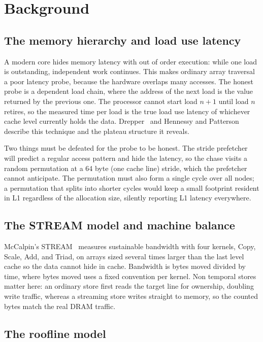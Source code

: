 \chapter{Background}

\section{The memory hierarchy and load use latency}

A modern core hides memory latency with out of order execution: while one load
is outstanding, independent work continues. This makes ordinary array traversal
a poor latency probe, because the hardware overlaps many accesses. The honest
probe is a dependent load chain, where the address of the next load is the value
returned by the previous one. The processor cannot start load $n+1$ until load
$n$ retires, so the measured time per load is the true load use latency of
whichever cache level currently holds the data. Drepper~\cite{drepper2007} and
Hennessy and Patterson~\cite{hennessy2019} describe this technique and the
plateau structure it reveals.

Two things must be defeated for the probe to be honest. The stride prefetcher
will predict a regular access pattern and hide the latency, so the chase visits
a random permutation at a 64 byte (one cache line) stride, which the prefetcher
cannot anticipate. The permutation must also form a single cycle over all nodes;
a permutation that splits into shorter cycles would keep a small footprint
resident in L1 regardless of the allocation size, silently reporting L1 latency
everywhere.

\section{The STREAM model and machine balance}

McCalpin's STREAM~\cite{mccalpin1995} measures sustainable bandwidth with four
kernels, Copy, Scale, Add, and Triad, on arrays sized several times larger than
the last level cache so the data cannot hide in cache. Bandwidth is bytes moved
divided by time, where bytes moved uses a fixed convention per kernel. Non
temporal stores matter here: an ordinary store first reads the target line for
ownership, doubling write traffic, whereas a streaming store writes straight to
memory, so the counted bytes match the real DRAM traffic.

\section{The roofline model}

